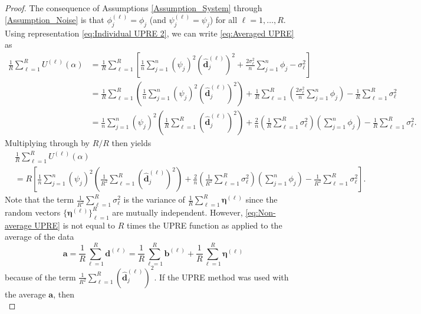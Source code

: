 \documentclass[12pt]{article}
\newcommand{\aVec}{\mathbf{a}}	%
\newcommand{\bVec}{\mathbf{b}}	%
\newcommand{\dVec}{\mathbf{d}}	%
\newcommand{\dft}[1]{\widehat{#1}}	%
\newcommand{\regparam}{\alpha}  %
\newcommand{\filt}{\phi}
\newcommand{\mfilt}{\psi}
\newcommand{\noise}{\eta}	%
\newcommand{\noiseSD}{\sigma}	%
\newcommand{\noiseVec}{\bm{\noise}}	%
\newcommand{\U}{U}	%
\begin{document}
\begin{proof}
The consequence of Assumptions \ref{Assumption_System} through \ref{Assumption_Noise} is that $\filt_j^{(\ell)} = \filt_j$ (and $\mfilt_j^{(\ell)} = \mfilt_j$) for all $\ell = 1,\ldots,R$. Using representation \eqref{eq:Individual UPRE 2}, we can write \eqref{eq:Averaged UPRE} as
\begin{align*}
\frac{1}{R} \sum_{\ell=1}^R \U^{(\ell)}(\regparam) &= \frac{1}{R} \sum_{\ell=1}^R \left[\frac{1}{n}\sum_{j=1}^{n} \left(\mfilt_j\right)^2\left(\dft{\dVec}_j^{(\ell)}\right)^2 + \frac{2\noiseSD_\ell^2}{n} \sum_{j=1}^{n} \filt_j - \noiseSD_\ell^2\right] \\
&= \frac{1}{R} \sum_{\ell=1}^R \left(\frac{1}{n}\sum_{j=1}^{n} \left(\mfilt_j\right)^2\left(\dft{\dVec}_j^{(\ell)}\right)^2\right) + \frac{1}{R} \sum_{\ell=1}^R \left(\frac{2\noiseSD_\ell^2}{n} \sum_{j=1}^{n} \filt_j\right) - \frac{1}{R} \sum_{\ell=1}^R\noiseSD_\ell^2 \\
&= \frac{1}{n}\sum_{j=1}^{n} \left(\mfilt_j\right)^2\left(\frac{1}{R} \sum_{\ell=1}^R \left(\dft{\dVec}_j^{(\ell)}\right)^2\right) + \frac{2}{n} \left(\frac{1}{R} \sum_{\ell=1}^R \noiseSD_\ell^2\right) \left(\sum_{j=1}^{n} \filt_j\right) - \frac{1}{R} \sum_{\ell=1}^R\noiseSD_\ell^2.
\end{align*}
Multiplying through by $R/R$ then yields
\begin{align}
\label{eq:Non-average UPRE}
&\frac{1}{R} \sum_{\ell=1}^R \U^{(\ell)}(\regparam) \nonumber \\
&= R\left[\frac{1}{n}\sum_{j=1}^{n} \left(\mfilt_j\right)^2\left(\frac{1}{R^2} \sum_{\ell=1}^R \left(\dft{\dVec}_j^{(\ell)}\right)^2\right) + \frac{2}{n} \left(\frac{1}{R^2} \sum_{\ell=1}^R \noiseSD_\ell^2\right) \left(\sum_{j=1}^{n} \filt_j\right) - \frac{1}{R^2} \sum_{\ell=1}^R\noiseSD_\ell^2\right].
\end{align}
Note that the term $\frac{1}{R^2} \sum_{\ell=1}^R\noiseSD_\ell^2$ is the variance of $\frac{1}{R} \sum_{\ell=1}^R \noiseVec^{(\ell)}$ since the random vectors $\{\noiseVec^{(\ell)}\}_{\ell=1}^R$ are mutually independent. However, \eqref{eq:Non-average UPRE} is not equal to $R$ times the UPRE function as applied to the average of the data
\[\aVec = \frac{1}{R}\sum_{\ell=1}^R \dVec^{(\ell)} = \frac{1}{R} \sum_{\ell=1}^R \bVec^{(\ell)} + \frac{1}{R} \sum_{\ell=1}^R \noiseVec^{(\ell)}\]
because of the term $\frac{1}{R^2} \sum_{\ell=1}^R \left(\dft{\dVec}_j^{(\ell)}\right)^2$. If the UPRE method was used with the average $\aVec$, then
\begin{equation}

\end{equation}
\end{proof}
\end{document}
